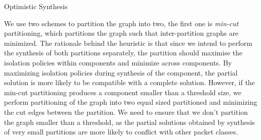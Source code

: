 \begin{algorithm}[H]
	\caption{Optimistic Synthesis}
	\label{optimisticsyn}
	\begin{algorithmic}[1]
		\Else
		   \EndIf
			   \EndIf
			 \Else
			\EndIf
		 \EndWhile
		\EndIf
		\EndProcedure
	\end{algorithmic}
\end{algorithm}

We use two schemes to partition the graph into two, the first one is \emph{min-cut} partitioning, which partitions the graph such that inter-partition graphs are minimized. The rationale behind the heuristic is that since we intend to perform the synthesis of both partitions separately, the partition should maximise the isolation policies within components and minimize across components. By maximizing isolation policies during synthesis of the component, the partial solution is more likely to be compatible with a complete solution. However, if the min-cut partitioning produces a component smaller than a threshold size, we perform partitioning of the graph into two equal sized partitioned and minimizing the cut edges between the partition. We need to ensure that we don't partition the graph smaller than a threshold, as the partial solutions obtained by synthesis of very small partitions are more likely to conflict with other packet classes.


